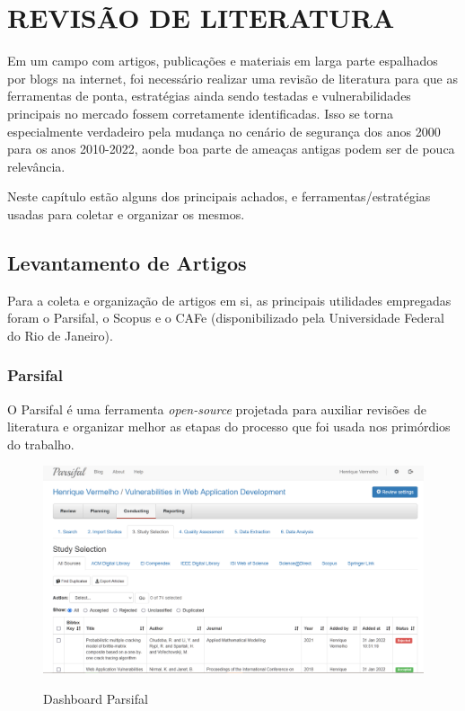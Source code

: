 \chapter{REVISÃO DE LITERATURA}
\label{chp:capitulo3}
Em um campo com artigos, publicações e materiais em larga parte espalhados por blogs na internet, foi necessário realizar uma revisão de literatura para que as ferramentas de ponta, estratégias ainda sendo testadas e vulnerabilidades principais no mercado fossem corretamente identificadas. Isso se torna especialmente verdadeiro pela mudança no cenário de segurança dos anos 2000 para os anos 2010-2022, aonde boa parte de ameaças antigas podem ser de pouca relevância.

Neste capítulo estão alguns dos principais achados, e ferramentas/estratégias usadas para coletar e organizar os mesmos.

\section{Levantamento de Artigos}

Para a coleta e organização de artigos em si, as principais utilidades empregadas foram o Parsifal, o Scopus e o CAFe (disponibilizado pela Universidade Federal do Rio de Janeiro). 

\subsection{Parsifal}

O Parsifal \cite{parsifal_docs} é uma ferramenta \textit{open-source} projetada para auxiliar revisões de literatura e organizar melhor as etapas do processo que foi usada nos primórdios do trabalho.

\begin{figure}[ht]
    \centering
    \caption{Dashboard Parsifal}
    \includegraphics[width=14cm]{figuras/parsifal.png} 
    \label{fig:internet} 
\end{figure}

